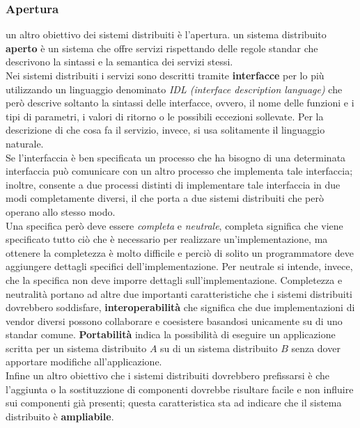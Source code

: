 \subsubsection{Apertura}
un altro obiettivo dei sistemi distribuiti è l'apertura. un sistema distribuito \textbf{aperto} è un sistema che offre servizi rispettando delle regole standar che descrivono la sintassi e la semantica dei servizi stessi.\\
Nei sistemi distribuiti i servizi sono descritti tramite \textbf{interfacce} per lo più utilizzando un linguaggio denominato \emph{IDL (interface description language)} che però descrive soltanto la sintassi delle interfacce, ovvero, il nome delle funzioni e i tipi di parametri, i valori di ritorno o le possibili eccezioni sollevate. Per la descrizione di che cosa fa il servizio, invece, si usa solitamente il linguaggio naturale.\\
Se l'interfaccia è ben specificata un processo che ha bisogno di una determinata interfaccia può comunicare con un altro processo che implementa tale interfaccia; inoltre, consente a due processi distinti di implementare tale interfaccia in due modi completamente diversi, il che porta a due sistemi distribuiti che però  operano allo stesso modo.\\
Una specifica però deve essere \emph{completa} e \emph{neutrale}, completa significa che viene specificato tutto ciò che è necessario per realizzare un'implementazione, ma ottenere la completezza è molto difficile e perciò di solito un programmatore deve aggiungere dettagli specifici dell'implementazione. Per neutrale si intende, invece, che la specifica non deve imporre dettagli sull'implementazione. Completezza e neutralità portano ad altre due importanti caratteristiche che i sistemi distribuiti dovrebbero soddisfare, \textbf{interoperabilità} che significa che due implementazioni di vendor diversi possono collaborare e coesistere basandosi unicamente su di uno standar comune. \textbf{Portabilità} indica la possibilità di eseguire un applicazione scritta per un sistema distribuito $A$ su di un sistema distribuito $B$ senza dover apportare modifiche all'applicazione.\\
Infine un altro obiettivo che i sistemi distribuiti dovrebbero prefissarsi è che l'aggiunta o la sostituzzione di componenti dovrebbe risultare facile e non influire sui componenti già presenti; questa caratteristica sta ad indicare che il sistema distribuito è \textbf{ampliabile}.